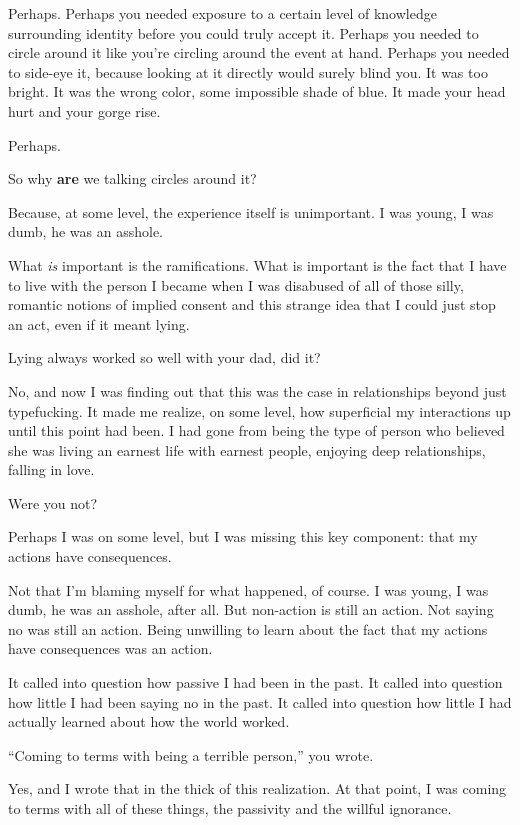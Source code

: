 \begin{ally}
Perhaps. Perhaps you needed exposure to a certain level of knowledge surrounding identity before you could truly accept it. Perhaps you needed to circle around it like you're circling around the event at hand. Perhaps you needed to side-eye it, because looking at it directly would surely blind you. It was too bright. It was the wrong color, some impossible shade of blue. It made your head hurt and your gorge rise.
\end{ally}
Perhaps.
\newpage

\begin{ally}
So why \textbf{are} we talking circles around it?
\end{ally}
Because, at some level, the experience itself is unimportant. I was young, I was dumb, he was an asshole.

What \emph{is} important is the ramifications. What is important is the fact that I have to live with the person I became when I was disabused of all of those silly, romantic notions of implied consent and this strange idea that I could just stop an act, even if it meant lying.

\begin{ally}
Lying always worked so well with your dad, did it?
\end{ally}
No, and now I was finding out that this was the case in relationships beyond just typefucking. It made me realize, on some level, how superficial my interactions up until this point had been. I had gone from being the type of person who believed she was living an earnest life with earnest people, enjoying deep relationships, falling in love.

\begin{ally}
Were you not?
\end{ally}
Perhaps I was on some level, but I was missing this key component: that my actions have consequences.

Not that I'm blaming myself for what happened, of course. I was young, I was dumb, he was an asshole, after all. But non-action is still an action. Not saying no was still an action. Being unwilling to learn about the fact that my actions have consequences was an action.

It called into question how passive I had been in the past. It called into question how little I had been saying no in the past. It called into question how little I had actually learned about how the world worked.

\begin{ally}
``Coming to terms with being a terrible person,'' you wrote.
\end{ally}
Yes, and I wrote that in the thick of this realization. At that point, I was coming to terms with all of these things, the passivity and the willful ignorance.

